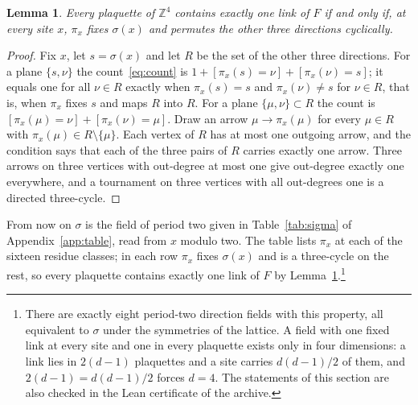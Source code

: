 \documentclass[11pt]{amsart}
\newtheorem{lemma}[theorem]{Lemma}
\theoremstyle{definition}
\theoremstyle{remark}
\numberwithin{equation}{section}
\newcommand{\Z}{\mathbb{Z}}
\begin{document}
\begin{lemma}\label{lem:cycle}
Every plaquette of $\Z^4$ contains exactly one link of $F$ if and only if, at
every site $x$, $\pi_x$ fixes $\sigma(x)$ and permutes the other three
directions cyclically.
\end{lemma}

\begin{proof}
Fix $x$, let $s=\sigma(x)$ and let $R$ be the set of the other three
directions. For a plane $\{s,\nu\}$ the count~\eqref{eq:count} is $1+[\pi_x(s)
=\nu]+[\pi_x(\nu)=s]$; it equals one for all $\nu\in R$ exactly when
$\pi_x(s)=s$ and $\pi_x(\nu)\ne s$ for $\nu\in R$, that is, when $\pi_x$ fixes
$s$ and maps $R$ into $R$. For a plane $\{\mu,\nu\}\subset R$ the count is
$[\pi_x(\mu)=\nu]+[\pi_x(\nu)=\mu]$. Draw an arrow $\mu\to\pi_x(\mu)$ for every
$\mu\in R$ with $\pi_x(\mu)\in R\setminus\{\mu\}$. Each vertex of $R$ has at most
one outgoing arrow, and the condition says that each of the three pairs of
$R$ carries exactly one arrow. Three arrows on three vertices with out-degree
at most one give out-degree exactly one everywhere, and a tournament on three
vertices with all out-degrees one is a directed three-cycle.
\end{proof}

From now on $\sigma$ is the field of period two given in
Table~\ref{tab:sigma} of Appendix~\ref{app:table}, read from $x$ modulo two.
The table lists $\pi_x$ at each of the sixteen residue classes; in each row
$\pi_x$ fixes $\sigma(x)$ and is a three-cycle on the rest, so every plaquette
contains exactly one link of $F$ by Lemma~\ref{lem:cycle}.\footnote{There are
exactly eight period-two direction fields with this property, all equivalent
to $\sigma$ under the symmetries of the lattice. A field with one fixed link
at every site and one in every plaquette exists only in four dimensions: a
link lies in $2(d-1)$ plaquettes and a site carries $d(d-1)/2$ of them, and
$2(d-1)=d(d-1)/2$ forces $d=4$. The statements of this section are also
checked in the Lean certificate of the archive.}
\end{document}
